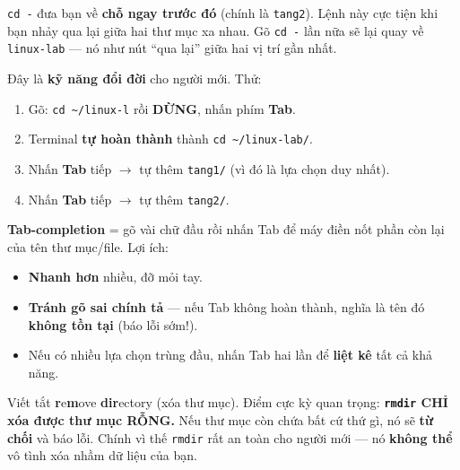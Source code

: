 \documentclass[12pt,a4paper]{article}
\newcommand{\hm}{\textasciitilde{}}
\begin{document}
\texttt{cd -} đưa bạn về \textbf{chỗ ngay trước đó} (chính là \texttt{tang2}). Lệnh này cực tiện khi bạn nhảy qua lại giữa hai thư mục xa nhau. Gõ \texttt{cd -} lần nữa sẽ lại quay về \texttt{linux-lab} --- nó như nút ``qua lại'' giữa hai vị trí gần nhất.

\begin{tipbox}[title={Bước 6 --- Mẹo gõ nhanh: phím Tab (tab-completion)}]
Đây là \textbf{kỹ năng đổi đời} cho người mới. Thử:
\begin{enumerate}[leftmargin=*]
  \item Gõ: \texttt{cd \hm/linux-l} rồi \textbf{DỪNG}, nhấn phím \textbf{Tab}.
  \item Terminal \textbf{tự hoàn thành} thành \texttt{cd \hm/linux-lab/}.
  \item Nhấn \textbf{Tab} tiếp $\rightarrow$ tự thêm \texttt{tang1/} (vì đó là lựa chọn duy nhất).
  \item Nhấn \textbf{Tab} tiếp $\rightarrow$ tự thêm \texttt{tang2/}.
\end{enumerate}

\textbf{Tab-completion} = gõ vài chữ đầu rồi nhấn Tab để máy điền nốt phần còn lại của tên thư mục/file. Lợi ích:
\begin{itemize}[leftmargin=*]
  \item \textbf{Nhanh hơn} nhiều, đỡ mỏi tay.
  \item \textbf{Tránh gõ sai chính tả} --- nếu Tab không hoàn thành, nghĩa là tên đó \textbf{không tồn tại} (báo lỗi sớm!).
  \item Nếu có nhiều lựa chọn trùng đầu, nhấn Tab hai lần để \textbf{liệt kê} tất cả khả năng.
\end{itemize}
\end{tipbox}

\begin{notebox}[title={Thuật ngữ --- \texttt{rmdir}}]
Viết tắt \textbf{r}e\textbf{m}ove \textbf{dir}ectory (xóa thư mục). Điểm cực kỳ quan trọng: \textbf{\texttt{rmdir} CHỈ xóa được thư mục RỖNG.} Nếu thư mục còn chứa bất cứ thứ gì, nó sẽ \textbf{từ chối} và báo lỗi. Chính vì thế \texttt{rmdir} rất an toàn cho người mới --- nó \textbf{không thể} vô tình xóa nhầm dữ liệu của bạn.
\end{notebox}
\end{document}
